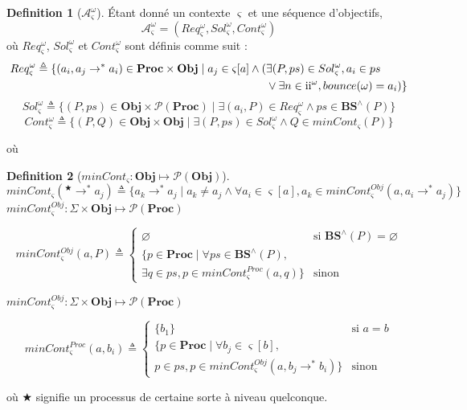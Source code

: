 \documentclass[11pt]{report}
\theoremstyle{definition}
\newtheorem{Def}{Definition}[chapter]
\begin{document}
\begin{Def}[$\mathcal{A}^\omega_\varsigma$]
\'Etant donn\'e un contexte $\varsigma$ et une s\'equence d'objectifs,
$$\mathcal{A}^\omega_\varsigma=(Req^\omega_\varsigma,Sol^\omega_\varsigma,Cont^\omega_\varsigma)$$
o\`u $Req^\omega_\varsigma$, $Sol^\omega_\varsigma$ et $Cont^\omega_\varsigma$ sont d\'efinis comme suit :
\begin{equation}
\begin{aligned}
Req^\omega_\varsigma\triangleq\{(a_i,a_j\to^*a_i)\in\mathbf{Proc\times Obj}\mid a_j\in \varsigma[a]\land(&\exists(P,ps)\in Sol^\omega_\varsigma,a_i\in ps\\
&\lor\exists n\in\text{\uppercase\expandafter{\romannumeral2}}^\omega,bounce(\omega)=a_i)\}
\end{aligned}
\nonumber
\end{equation}
$$Sol^\omega_\varsigma\triangleq\{(P,ps)\in\mathbf{Obj\times \mathcal{P}(Proc)}\mid \exists(a_i,P)\in Req^\omega_\varsigma\land ps\in\mathbf{BS}^\wedge(P)\}$$
$$Cont^\omega_\varsigma\triangleq\{(P,Q)\in\mathbf{Obj\times Obj}\mid \exists(P,ps)\in Sol^\omega_\varsigma\land Q\in minCont_\varsigma(P)\}$$
\end{Def}
o\`u

\begin{Def}[$minCont_\varsigma:\mathbf{Obj}\mapsto\mathcal{P}(\mathbf{Obj})$]
$$minCont_\varsigma(^\bigstar\to^*a_j)\triangleq\{a_k\to^*a_j\mid a_k\neq a_j\land\forall a_i\in\varsigma[a],a_k\in minCont_\varsigma^{Obj}(a,a_i\to^*a_j)\}$$
$minCont_\varsigma^{Obj}:\Sigma\times\mathbf{Obj\mapsto\mathcal{P}(Proc)}$

$$minCont_\varsigma^{Obj}(a,P)\triangleq
\begin{cases}
\varnothing&\text{si }\mathbf{BS}^\wedge(P)=\varnothing\\
\{p\in \mathbf{Proc}\mid \forall ps\in\mathbf{BS}^\wedge(P),&\\
          \exists q\in ps,p\in minCont_\varsigma^{Proc}(a,q)\} &\text{sinon}
\end{cases}
$$

$minCont_\varsigma^{Obj}:\Sigma\times\mathbf{Obj\mapsto\mathcal{P}(Proc)}$

$$minCont_\varsigma^{Proc}(a,b_i)\triangleq
\begin{cases}
\{b_1\}                                                    &\text{si }a=b\\
\{p\in     \mathbf{Proc}\mid \forall b_j\in\varsigma[b],&\\
           p\in ps,p\in minCont_\varsigma^{Obj}(a,b_j\to^*b_i)\} &\text{sinon}
\end{cases}
$$
\end{Def}
o\`u $\bigstar$ signifie un processus de certaine sorte \`a niveau quelconque.
\end{document}
